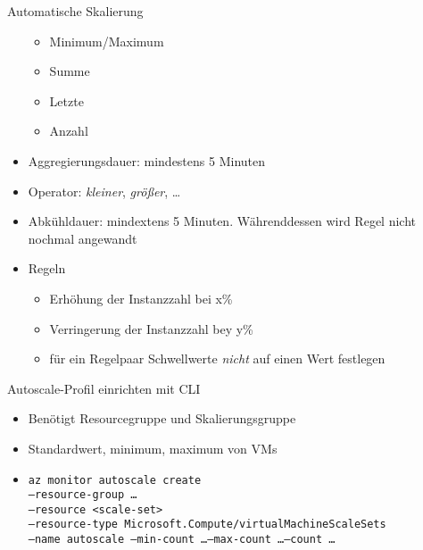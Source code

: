 \begin{flashcard}[Definition]{Automatische Skalierung}
\begin{itemize}
\begin{itemize}
                \item Minimum/Maximum
                \item Summe
                \item Letzte
                \item Anzahl
            \end{itemize}
        \item Aggregierungsdauer: mindestens 5 Minuten
        \item Operator: \emph{kleiner}, \emph{größer}, \ldots
        \item Abkühldauer: mindextens 5 Minuten. Währenddessen wird Regel nicht nochmal angewandt
        \item Regeln
            \begin{itemize}
                \item Erhöhung der Instanzzahl bei x\%
                \item Verringerung der Instanzzahl bey y\%
                \item für ein Regelpaar Schwellwerte \emph{nicht} auf einen Wert festlegen
            \end{itemize}

    \end{itemize}
\end{flashcard}

\begin{flashcard}[Definition]{Autoscale-Profil einrichten mit CLI}
    \begin{itemize}
        \item Benötigt Resourcegruppe und Skalierungsgruppe
        \item Standardwert, minimum, maximum von VMs
        \item \texttt{az monitor autoscale create\\--resource-group \ldots\\--resource <scale-set>\\--resource-type Microsoft.Compute/virtualMachineScaleSets\\--name autoscale --min-count \ldots --max-count \ldots --count \ldots}
    \end{itemize}
\end{flashcard}

